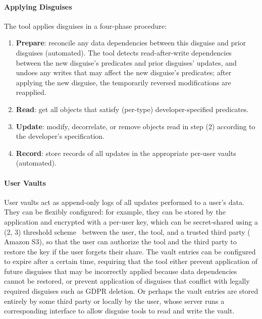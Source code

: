 \paragraph{Applying Disguises}
The tool applies disguises in a four-phase procedure:
\begin{enumerate}
    \item \textbf{Prepare}: reconcile any data dependencies between this disguise and prior disguises (automated).
            The tool detects read-after-write dependencies between the new disguise's predicates and prior disguises'
            updates, and undoes any writes that may affect the new disguise's predicates; after
            applying the new disguise, the temporarily reversed modifications are reapplied.
        \item \textbf{Read}: get all objects that satisfy (per-type) developer-specified predicates.
        \item \textbf{Update}: modify, decorrelate, or remove objects read in step (2) according to the
        developer's specification.
    \item \textbf{Record}: store records of all updates in the appropriate per-user vaults (automated).
\end{enumerate}

\paragraph{User Vaults}
User vaults act as append-only logs of all updates performed to a user's data.
They can be flexibly configured: for example, they can be stored by the application and
encrypted with a per-user key, which can be secret-shared using a (2, 3)
threshold scheme~\cite{secretsharing} between the user, the tool, and a trusted third party (\eg
Amazon S3), so that the user can authorize the tool and the third party to restore the key if
the user forgets their share. The vault entries can be configured to expire after a certain
time, requiring that the tool either prevent application of future disguises that may be incorrectly
applied because data dependencies cannot be restored, or prevent application of disguises that
conflict with legally required disguises such as GDPR deletion.
Or perhaps the vault entries are stored entirely by some third party or locally by the user, whose
server runs a corresponding interface to allow disguise tools to read and write the vault.

